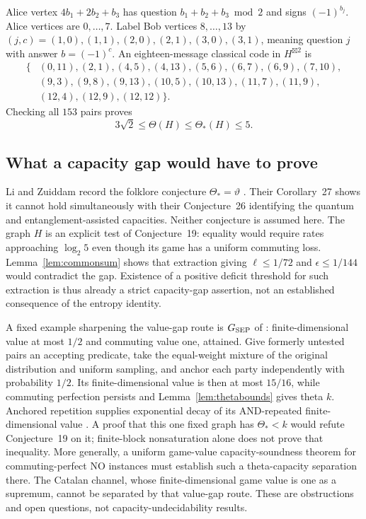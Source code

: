 Alice vertex $4b_1+2b_2+b_3$ has question $b_1+b_2+b_3\bmod 2$ and signs $(-1)^{b_j}$. Alice vertices are $0,\ldots,7$. Label Bob vertices $8,\ldots,13$ by $(j,c)=(1,0),(1,1),(2,0),(2,1),(3,0),(3,1)$, meaning question $j$ with answer $b=(-1)^c$. An eighteen-message classical
code in $H^{\boxtimes2}$ is
\[
\begin{split}
\{&(0,11),(2,1),(4,5),(4,13),(5,6),(6,7),(6,9),(7,10),\\
 &(9,3),(9,8),(9,13),(10,5),(10,13),(11,7),(11,9),\\
 &(12,4),(12,9),(12,12)\}.
\end{split}
\]
Checking all $153$ pairs proves
\[
 3\sqrt2\le\Theta(H)\le\Theta_*(H)\le5.
\]

\subsection{What a capacity gap would have to prove}
Li and Zuiddam record the folklore conjecture $\Theta_* =\vartheta$
\cite[Conjecture~19, v3]{LZ}. Their Corollary~27 shows it cannot hold
simultaneously with their Conjecture~26 identifying the quantum and
entanglement-assisted capacities. Neither conjecture is assumed here.
The graph $H$ is an explicit test of Conjecture~19: equality would
require rates approaching $\log_2 5$ even though its game has a uniform
commuting loss. Lemma~\ref{lem:commonsum} shows that extraction giving
$\ell\le1/72$ and $\epsilon\le1/144$ would contradict the gap.
Existence of a positive deficit threshold for such extraction is thus
already a strict capacity-gap assertion, not an established consequence
of the entropy identity.

A fixed example sharpening the value-gap route is $G_{\rm SEP}$ of
\cite[Theorem~12.10]{MIPRE}: finite-dimensional value at most $1/2$
and commuting value one, attained. Give formerly untested pairs an
accepting predicate, take the equal-weight mixture of the original distribution and uniform sampling,
and anchor each party independently with probability $1/2$. Its
finite-dimensional value is then at most $15/16$, while commuting
perfection persists and Lemma~\ref{lem:thetabounds} gives theta $k$.
Anchored repetition supplies exponential decay of its AND-repeated
finite-dimensional value \cite[Theorem~1.3]{BVY}. A proof that this
one fixed graph has $\Theta_*<k$ would refute Conjecture~19 on it;
finite-block nonsaturation alone does not prove that inequality.
More generally, a uniform game-value capacity-soundness theorem for
commuting-perfect NO instances must establish such a theta-capacity
separation there. The Catalan channel, whose finite-dimensional game
value is one as a supremum, cannot be separated by that value-gap route.
These are obstructions and open questions, not capacity-undecidability
results.


